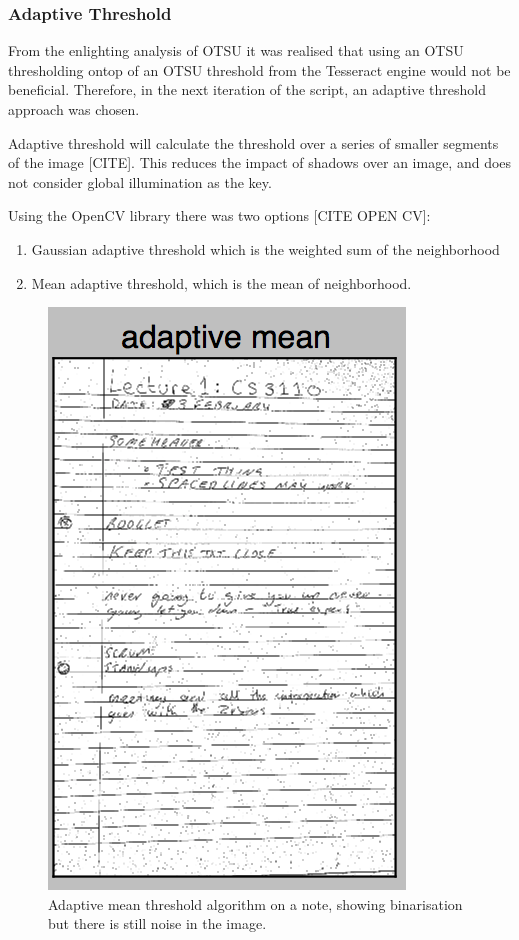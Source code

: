 \subsubsection{Adaptive Threshold} \label{section:threshold}
From the enlighting analysis of OTSU it was realised that using an OTSU thresholding ontop of an OTSU threshold from the Tesseract engine would not be beneficial. Therefore, in the next iteration of the script, an adaptive threshold approach was chosen.

Adaptive threshold will calculate the threshold over a series of smaller segments of the image [CITE]. This reduces the impact of shadows over an image, and does not consider global illumination as the key.

Using the OpenCV library there was two options [CITE OPEN CV]:
\begin{enumerate}
  \item Gaussian adaptive threshold which is the weighted sum of the neighborhood
  \item Mean adaptive threshold, which is the mean of neighborhood.
\end{enumerate}

\begin{figure}[H]
  \centering
  \includegraphics{images/adaptive_mean}
  \caption{Adaptive mean threshold algorithm on a note, showing binarisation but there is still noise in the image.}
  \label{fig:adaptive_mean}
\end{figure}

